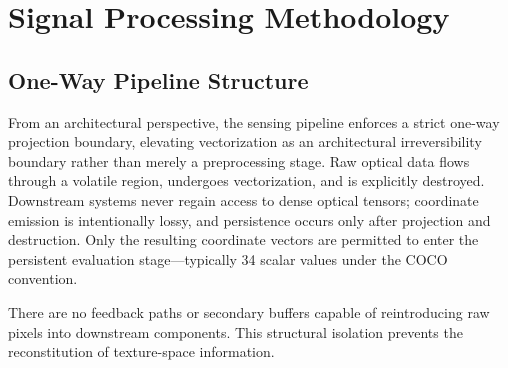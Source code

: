 \documentclass[conference]{IEEEtran}
\begin{document}
\section{Signal Processing Methodology}

\subsection{One-Way Pipeline Structure}

From an architectural perspective, the sensing pipeline enforces a strict one-way projection boundary, elevating vectorization as an architectural irreversibility boundary rather than merely a preprocessing stage. Raw optical data flows through a volatile region, undergoes vectorization, and is explicitly destroyed. Downstream systems never regain access to dense optical tensors; coordinate emission is intentionally lossy, and persistence occurs only after projection and destruction. Only the resulting coordinate vectors are permitted to enter the persistent evaluation stage—typically 34 scalar values under the COCO convention.

There are no feedback paths or secondary buffers capable of reintroducing raw pixels into downstream components. This structural isolation prevents the reconstitution of texture-space information.
\end{document}
